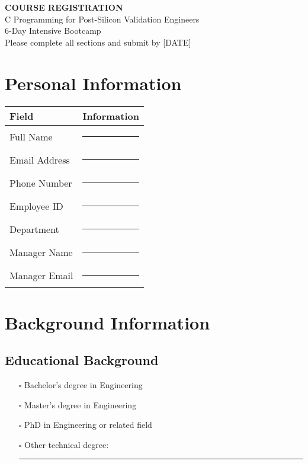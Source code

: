 \documentclass[11pt,a4paper]{article}
\begin{document}
\begin{center}
    {\Huge\bfseries\color{courseblue} COURSE REGISTRATION}\\[0.5cm]
    {\Large C Programming for Post-Silicon Validation Engineers}\\[0.3cm]
    {\large 6-Day Intensive Bootcamp}\\[0.2cm]
    {\normalsize Please complete all sections and submit by [DATE]}
\end{center}

\vspace{1cm}

\section{Personal Information}

\begin{tabular}{|p{4cm}|p{10cm}|}
\hline
\rowcolor{formgray}
\textbf{Field} & \textbf{Information} \\
\hline
Full Name & \rule{8cm}{0.4pt} \\
\hline
Email Address & \rule{8cm}{0.4pt} \\
\hline
Phone Number & \rule{8cm}{0.4pt} \\
\hline
Employee ID & \rule{8cm}{0.4pt} \\
\hline
Department & \rule{8cm}{0.4pt} \\
\hline
Manager Name & \rule{8cm}{0.4pt} \\
\hline
Manager Email & \rule{8cm}{0.4pt} \\
\hline
\end{tabular}

\section{Background Information}

\subsection{Educational Background}
\begin{itemize}[leftmargin=0.5cm]
    \item[$\square$] Bachelor's degree in Engineering
    \item[$\square$] Master's degree in Engineering
    \item[$\square$] PhD in Engineering or related field
    \item[$\square$] Other technical degree: \rule{5cm}{0.4pt}
\end{itemize}
\end{document}

